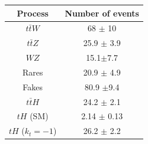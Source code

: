 \documentclass[11pt]{beamer}
\begin{document}
{\begin{frame}
\begin{minipage}[c]{.45\textwidth}
\begin{table}
	\begin{tabular}{cc}
		\hline
		Process & Number of events \\
		\hline
		$t\bar{t}W$ & 68 $\pm$ 10 \\
		$t\bar{t}Z$ & 25.9 $\pm$ 3.9\\
		$WZ$ & 15.1$\pm$7.7\\
		Rares & 20.9 $\pm$ 4.9\\
		Fakes & 80.9 $\pm$9.4\\
		$t\bar{t}H$ & 24.2 $\pm$ 2.1 \\
		\hline
		$tH$ (SM) & 2.14 $\pm$ 0.13\\
		$tH$ ($k_t=-1$) &26.2 $\pm$ 2.2
	\end{tabular}	
	\label{tth-table}
\end{table}

\end{minipage}
\end{frame}
}
\end{document}
